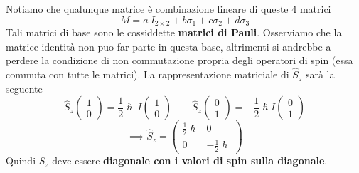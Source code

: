 Notiamo che qualunque matrice è combinazione lineare di queste 4
matrici
\[
    M = a \ I_{2 \times 2} + b \sigma_{1} + c \sigma_{2} + d \sigma_{3}
\]
Tali matrici di base sono le cossiddette \textbf{matrici di Pauli}.
Osserviamo che la matrice identità non puo far parte in questa base,
altrimenti si andrebbe a perdere la condizione di non commutazione
propria degli operatori di spin (essa commuta con tutte le matrici).
La
rappresentazione matriciale di \(\hat{S}_{z}\) sarà la seguente \[
                                                                    \hat{S}_{z} \begin{pmatrix}
                                                                                    1 \\
                                                                                    0
                                                                    \end{pmatrix} =
                                                                    \frac{1}{2} \hslash \ I
                                                                    \begin{pmatrix}
                                                                        1 \\
                                                                        0
                                                                    \end{pmatrix}
                                                                    \qquad
                                                                    \hat{S}_{z} \begin{pmatrix}
                                                                                    0 \\
                                                                                    1
                                                                    \end{pmatrix}
                                                                    = - \frac{1}{2} \hslash I \begin{pmatrix}
                                                                                                  0 \\
                                                                                                  1
                                                                    \end{pmatrix}
\] \[
       \implies
       \hat{S}_{z} =
       \begin{pmatrix}
           \frac{1}{2} \hslash & 0                     \\
           0                   & - \frac{1}{2} \hslash
       \end{pmatrix}
\] Quindi \(\hat{S}_{z}\) deve essere \textbf{diagonale con i valori di
spin sulla diagonale}.
